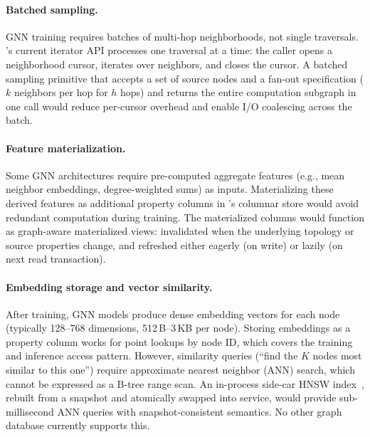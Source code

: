 \paragraph{Batched sampling.}
GNN training requires batches of multi-hop neighborhoods, not single traversals.
\project{}'s current iterator API processes one traversal at a time: the caller opens a neighborhood cursor, iterates over neighbors, and closes the cursor.
A batched sampling primitive that accepts a set of source nodes and a fan-out specification ($k$ neighbors per hop for $h$ hops) and returns the entire computation subgraph in one call would reduce per-cursor overhead and enable I/O coalescing across the batch.

\paragraph{Feature materialization.}
Some GNN architectures require pre-computed aggregate features (e.g., mean neighbor embeddings, degree-weighted sums) as inputs.
Materializing these derived features as additional property columns in \project{}'s columnar store would avoid redundant computation during training.
The materialized columns would function as graph-aware materialized views: invalidated when the underlying topology or source properties change, and refreshed either eagerly (on write) or lazily (on next read transaction).

\paragraph{Embedding storage and vector similarity.}
After training, GNN models produce dense embedding vectors for each node (typically 128--768 dimensions, 512\,B--3\,KB per node).
Storing embeddings as a \wt{} property column works for point lookups by node ID, which covers the training and inference access pattern.
However, similarity queries (``find the $K$ nodes most similar to this one'') require approximate nearest neighbor (ANN) search, which cannot be expressed as a B-tree range scan.
An in-process side-car HNSW index~\cite{malkov2020hnsw}, rebuilt from a \wt{} snapshot and atomically swapped into service, would provide sub-millisecond ANN queries with snapshot-consistent semantics.
No other graph database currently supports this.
